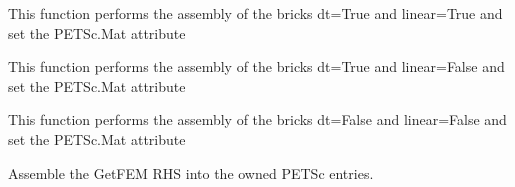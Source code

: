 \documentclass[letterpaper,10pt,english]{sphinxmanual}
\begin{document}
\begin{fulllineitems}
\begin{fulllineitems}
\end{fulllineitems}


\begin{fulllineitems}
\label{\detokenize{scrimp:scrimp.dphs.DPHS.assemble_mass}}
\pysigstartsignatures
\pysiglinewithargsret
{}
{}
{}
\pysigstopsignatures
\sphinxAtStartPar
This function performs the assembly of the bricks dt=True and linear=True and set the PETSc.Mat attribute 

\end{fulllineitems}


\begin{fulllineitems}
\label{\detokenize{scrimp:scrimp.dphs.DPHS.assemble_nl_mass}}
\pysigstartsignatures
\pysiglinewithargsret
{}
{}
{}
\pysigstopsignatures
\sphinxAtStartPar
This function performs the assembly of the bricks dt=True and linear=False and set the PETSc.Mat attribute 

\end{fulllineitems}


\begin{fulllineitems}
\label{\detokenize{scrimp:scrimp.dphs.DPHS.assemble_nl_stiffness}}
\pysigstartsignatures
\pysiglinewithargsret
{}
{}
{}
\pysigstopsignatures
\sphinxAtStartPar
This function performs the assembly of the bricks dt=False and linear=False and set the PETSc.Mat attribute 

\end{fulllineitems}


\begin{fulllineitems}
\label{\detokenize{scrimp:scrimp.dphs.DPHS.assemble_rhs}}
\pysigstartsignatures
\pysiglinewithargsret
{}
{\sphinxparamcomma {}}
{}
\pysigstopsignatures
\sphinxAtStartPar
Assemble the GetFEM RHS into the owned PETSc entries.


\end{fulllineitems}
\end{fulllineitems}
\end{document}
